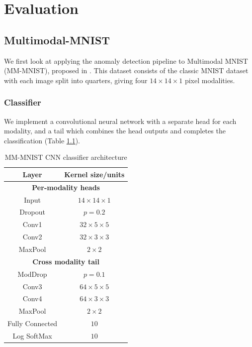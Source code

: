 \chapter{Evaluation}

\section{Multimodal-MNIST}
We first look at applying the anomaly detection pipeline to Multimodal MNIST (MM-MNIST), proposed in \cite{ModDrop}. This dataset consists of the classic MNIST dataset \cite{MNIST} with each image split into quarters, giving four $14\times 14 \times 1$ pixel modalities.\\ 

\subsection{Classifier}
We implement a convolutional neural network with a separate head for each modality, and a tail which combines the head outputs and completes the classification (Table \ref{table:mm-mnist}).\\

\begin{table}[ht]
    \caption{MM-MNIST CNN classifier architecture}
    \centering
    \begin{tabular}{c c}
    \\
    \hline\hline
    \textbf{Layer} & \textbf{Kernel size/units} \\ [0.5ex]
    \hline
    \multicolumn{2}{c}{\textbf{Per-modality heads}} \\
    \hline
    Input & $14\times 14\times 1$ \\
    Dropout & $p=0.2$ \\
    Conv1 & $32\times 5 \times 5$ \\
    Conv2 & $32\times 3 \times 3$ \\
    MaxPool & $2\times 2$\\
    \hline
    \multicolumn{2}{c}{\textbf{Cross modality tail}} \\
    \hline 
    ModDrop & $p=0.1$ \\
    Conv3 & $64 \times 5 \times 5$ \\
    Conv4 & $64 \times 3 \times 3$ \\
    MaxPool & $2 \times 2$ \\
    Fully Connected & $10$ \\
    Log SoftMax & $10$ \\ [1ex] 
    \hline
    \end{tabular}
    \label{table:mm-mnist}
\end{table}
    
